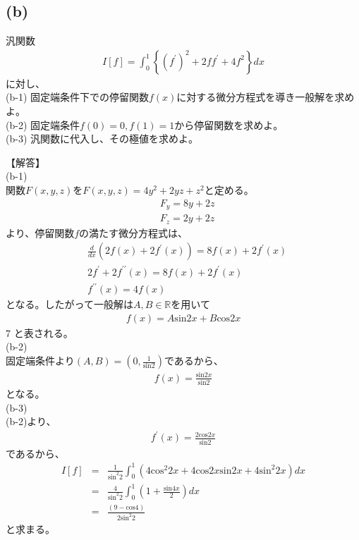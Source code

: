 \documentclass[pdflatex,ja=standard,fleqn]{bxjsarticle}
\begin{document}
\subsection*{(b)}
\begin{screen}
    汎関数
    \begin{eqnarray*}
        I\left[f\right]=\int_{0}^{1} \left\{(f^{\prime})^2+2ff^{\prime}+4f^2\right\}dx
    \end{eqnarray*}
    に対し、\\
    (b-1) 固定端条件下での停留関数$f(x)$に対する微分方程式を導き一般解を求めよ。\\
    (b-2) 固定端条件$f(0)=0,f(1)=1$から停留関数を求めよ。\\
    (b-3) 汎関数に代入し、その極値を求めよ。
\end{screen}
【解答】\\
(b-1)\\
関数$F(x,y,z)$を$F(x,y,z)=4y^2+2yz+z^2$と定める。
\begin{align*}
    &F_{y}=8y+2z\\
    &F_{z}=2y+2z
\end{align*}
より、停留関数$f$の満たす微分方程式は、
\begin{align*}
    &\frac{d}{dx}\left(2f(x)+2f^{\prime}(x)\right)=8f(x)+2f^{\prime}(x)\\
    &2f^{\prime}+2f^{\prime\prime}(x)=8f(x)+2f^{\prime}(x)\\
    &f^{\prime\prime}(x)=4f(x)
\end{align*}
となる。したがって一般解は$A,B\in\mathbb{R}$を用いて
\begin{eqnarray*}
    f(x)=A\mathrm{sin}2x+B\mathrm{cos}2x
\end{eqnarray*}7
と表される。\\
(b-2)\\
固定端条件より$\left(A,B\right)=\left(0,\frac{1}{\mathrm{sin}2}\right)$であるから、
\begin{eqnarray*}
    f(x)=\frac{\mathrm{sin}2x}{\mathrm{sin}2}
\end{eqnarray*}
となる。\\
(b-3)\\
(b-2)より、
\begin{eqnarray*}
    f^{\prime}(x)=\frac{2\mathrm{cos}2x}{\mathrm{sin}2}
\end{eqnarray*}
であるから、
\begin{eqnarray*}
    I\left[f\right]&=&\frac{1}{\mathrm{sin}^{2}2}\int_{0}^{1} \left(4\mathrm{cos}^{2}2x+4\mathrm{cos}2x\mathrm{sin}2x+4\mathrm{sin}^{2}2x\right)dx\\
    &=&\frac{4}{\mathrm{sin}^{2}2}\int_{0}^{1} \left(1+\frac{\mathrm{sin}4x}{2}\right)dx\\
    &=&\frac{\left(9-\mathrm{cos}4\right)}{2\mathrm{sin}^{2}2}
\end{eqnarray*}
と求まる。
\end{document}
